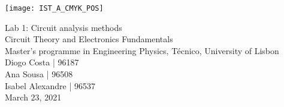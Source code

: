 
\thispagestyle {empty}

\texttt{[image: IST\_A\_CMYK\_POS]}

\begin{center}
%
\vspace{1.0cm}

\vspace{1cm}
{\FontLb Lab 1: Circuit analysis methods} \\ %
\vspace{1cm}
{\FontSn Circuit Theory and Electronics Fundamentals} \\ %
{\FontSn Master's programme in Engineering Physics, Técnico, University of Lisbon} \\ %
\vspace{1cm}
{\FontSn Diogo Costa | 96187} \\
{\FontSn Ana Sousa | 96508} \\
{\FontSn Isabel Alexandre | 96537} \\
\vspace{1cm}
{\FontSn March 23, 2021} \\ %
%
\end{center}


